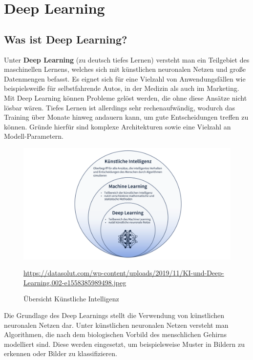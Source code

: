 \chapter{Deep Learning}

\section{Was ist Deep Learning?}

Unter \textbf{Deep Learning} (zu deutsch tiefes Lernen) versteht man ein Teilgebiet des maschinellen Lernens, welches sich mit künstlichen neuronalen Netzen und große Datenmengen befasst. Es eignet sich für eine Vielzahl von Anwendungsfällen wie beispielsweiße für selbstfahrende Autos, in der Medizin als auch im Marketing. \cite{datasolut2}\\

Mit Deep Learning können Probleme gelöst werden, die ohne diese Ansätze nicht lösbar wären. Tiefes Lernen ist allerdings sehr rechenaufwändig, wodurch das Training über Monate hinweg andauern kann, um gute Entscheidungen treffen zu können. Gründe hierfür sind komplexe Architekturen sowie eine Vielzahl an Modell-Parametern. \cite{datasolut2} \\

\begin{figure}[H]
	\centering
	\includegraphics[width=\textwidth]{kapitel3/images/KI_Uebersicht.png}
	\label{fig:ki-übersicht}
	\caption{Übersicht Künstliche Intelligenz}
	\vspace{0.2cm}
	\quelle\url{https://datasolut.com/wp-content/uploads/2019/11/KI-und-Deep-Learning.002-e1558385989498.jpeg}
\end{figure}

Die Grundlage des Deep Learnings stellt die Verwendung von künstlichen neuronalen Netzen dar. Unter künstlichen neuronalen Netzen versteht man Algorithmen, die nach dem biologischen Vorbild des menschlichen Gehirns modelliert sind. Diese werden eingesetzt, um beispielsweise Muster in Bildern zu erkennen oder Bilder zu klassifizieren. \cite{datasolut2}\\

